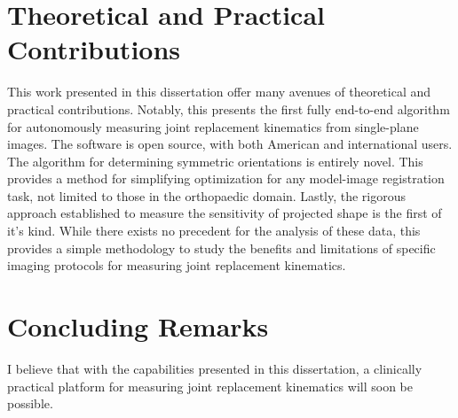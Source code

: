 \section{Theoretical and Practical Contributions}
This work presented in this dissertation offer many avenues of theoretical and practical contributions.
Notably, this presents the first fully end-to-end algorithm for autonomously measuring joint replacement kinematics from single-plane images.
The software is open source, with both American and international users.
The algorithm for determining symmetric orientations is entirely novel.
This provides a method for simplifying optimization for any model-image registration task, not limited to those in the orthopaedic domain.
Lastly, the rigorous approach established to measure the sensitivity of projected shape is the first of it's kind.
While there exists no precedent for the analysis of these data, this provides a simple methodology to study the benefits and limitations of specific imaging protocols for measuring joint replacement kinematics.

\section{Concluding Remarks}
I believe that with the capabilities presented in this dissertation, a clinically practical platform for measuring joint replacement kinematics will soon be possible.



